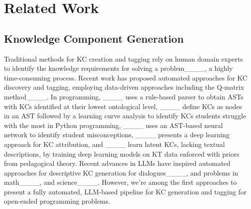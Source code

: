 \section{Related Work}



\subsection{Knowledge Component Generation} 

Traditional methods for KC creation and tagging rely on human domain experts to identify the knowledge requirements for solving a problem____, a highly time-consuming process.
Recent work has proposed automated approaches for KC discovery and tagging, employing data-driven approaches including the Q-matrix method____. 
In programming, ____ uses a rule-based parser to obtain ASTs with KCs identified at their lowest ontological level, ____ define KCs as nodes in an AST followed by a learning curve analysis to identify KCs students struggle with the
most in Python programming, ____ uses an AST-based neural network to identify student misconceptions, ____ presents a deep learning approach for KC attribution, and ____ learn latent KCs, lacking textual descriptions, by training deep learning models on KT data enforced with priors from pedagogical theory.
Recent advances in LLMs have inspired automated approaches for descriptive KC generation for dialogues____, and problems in math____, and science____. 
However, we're among the first approaches to present a fully automated, LLM-based pipeline for KC generation and tagging for open-ended programming problems.

